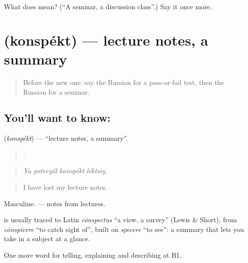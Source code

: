 \begin{tcolorbox}[breakable,colback=teal!4,colframe=teal!35!black,title={Before you move on}]
What does  mean? (\textquotedblleft{}A seminar, a discussion class\textquotedblright{}.) Say it once more.
\end{tcolorbox}
\section[\texorpdfstring{\ru{конспект} (konspékt)}{конспект (konspékt)}]{ (konspékt) — lecture notes, a summary}

\label{lesson:RU-C381-konspekt}



\begin{quote}
Before the new one: say the Russian for a pass-or-fail test, then the Russian for a seminar.
\end{quote}

\subsection*{You'll want to know: }
\textbf{} (\emph{konspékt}) — \textquotedblleft{}lecture notes, a summary\textquotedblright{}.

\begin{quote}
   .
\end{quote}

\begin{quote}
\emph{Ya poteryál konspékt léktsiy.}
\end{quote}

\begin{quote}
I have lost my lecture notes.
\end{quote}

Masculine. \emph{ } — notes from lectures.

\begin{cousinweb}
\textbf{} is usually traced to Latin \emph{cōnspectus} \textquotedblleft{}a view, a survey\textquotedblright{} (Lewis \& Short), from \emph{cōnspicere} \textquotedblleft{}to catch sight of\textquotedblright{}, built on \emph{specere} \textquotedblleft{}to see\textquotedblright{}: a summary that lets you take in a subject at a glance.
\end{cousinweb}

\begin{grammarlens}[title={What you've built}]
One more word for telling, explaining and describing at B1.
\end{grammarlens}


